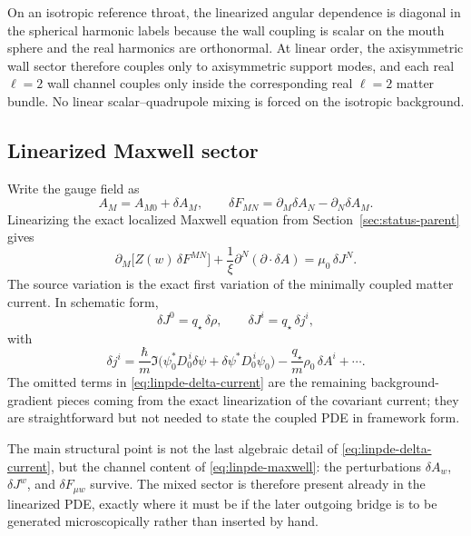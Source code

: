 \documentclass[11pt]{article}
\theoremstyle{definition}
\begin{document}
On an isotropic reference throat, the linearized angular dependence is diagonal in the spherical harmonic labels because the wall coupling is scalar on the mouth sphere and the real harmonics are orthonormal. At linear order, the axisymmetric wall sector therefore couples only to axisymmetric support modes, and each real $\ell=2$ wall channel couples only inside the corresponding real $\ell=2$ matter bundle. No linear scalar--quadrupole mixing is forced on the isotropic background.

\subsection{Linearized Maxwell sector}

Write the gauge field as
\begin{equation}
A_M=A_{M0}+\delta A_M,
\qquad
\delta F_{MN}=\partial_M\delta A_N-\partial_N\delta A_M.
\label{eq:linpde-maxwell-variation}
\end{equation}
Linearizing the exact localized Maxwell equation from Section~\ref{sec:status-parent} gives
\begin{equation}
\partial_M\bigl[Z(w)\,\delta F^{MN}\bigr]
+
\frac{1}{\xi}\partial^N(\partial\!\cdot\!\delta A)
=
\mu_0\,\delta J^N.
\label{eq:linpde-maxwell}
\end{equation}
The source variation is the exact first variation of the minimally coupled matter current. In schematic form,
\begin{equation}
\delta J^0=q_\star\,\delta\rho,
\qquad
\delta J^i=q_\star\,\delta j^i,
\label{eq:linpde-current-variation}
\end{equation}
with
\begin{equation}
\delta j^i
=
\frac{\hbar}{m}\Im\!\bigl(\psi_0^*D_0^{\,i}\delta\psi+\delta\psi^*D_0^{\,i}\psi_0\bigr)
-
\frac{q_\star}{m}\rho_0\,\delta A^i
+\cdots.
\label{eq:linpde-delta-current}
\end{equation}
The omitted terms in \eqref{eq:linpde-delta-current} are the remaining background-gradient pieces coming from the exact linearization of the covariant current; they are straightforward but not needed to state the coupled PDE in framework form.

The main structural point is not the last algebraic detail of \eqref{eq:linpde-delta-current}, but the channel content of \eqref{eq:linpde-maxwell}: the perturbations $\delta A_w$, $\delta J^w$, and $\delta F_{\mu w}$ survive. The mixed sector is therefore present already in the linearized PDE, exactly where it must be if the later outgoing bridge is to be generated microscopically rather than inserted by hand.
\end{document}
